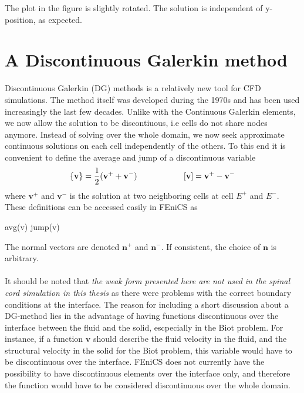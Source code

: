 The plot in the figure is slightly rotated. The solution is independent of y-position, as expected. 	

\section{A Discontinuous Galerkin method}
Discontinuous Galerkin (DG) methods is a relatively new tool for CFD simulations. The method itself was developed during the 1970s and has been used increasingly the last few decades. Unlike with the Continuous Galerkin elements, we now allow the solution to be discontiuous, i.e cells do not share nodes anymore. Instead of solving over the whole domain, we now seek approximate continuous solutions on each cell independently of the others. To this end it is convenient to define the average and jump of a discontinuous variable
\begin{align} 
\{\mathbf{v}\} = \frac{1}{2}(\mathbf{v}^+ + \mathbf{v}^-) \hspace{2 cm}  [\mathbf{v}]  =  \mathbf{v}^+ - \mathbf{v}^- \label{Avg_jump}
\end{align}
where $\mathbf{v}^+$ and $\mathbf{v}^-$ is the solution at two neighboring cells at cell $E^+$ and $E^-$. These definitions can be accessed easily in FEniCS as
\begin{center}
\begin{cverbatim}
avg(v)
jump(v)
\end{cverbatim}
\end{center}
The normal vectors are denoted $\mathbf{n}^+$ and $\mathbf{n}^-$. If consistent, the choice of $\mathbf{n}$ is arbitrary. \cite{Rivi08}
\\
\\
It should be noted that \textit{the weak form presented here are not used in the spinal cord simulation in this thesis} as there were problems with the correct boundary conditions at the interface. The reason for including a short discussion about a DG-method lies in the advantage of having functions discontinuous over the interface between the fluid and the solid, escpecially in the Biot problem. For instance, if a function $\mathbf{v}$ should describe the fluid velocity in the fluid, and the structural velocity in the solid for the Biot problem, this variable would have to be discontinuous over the interface. FEniCS does not currently have the possibility to have discontinuous elements over the interface only, and therefore the function would have to be considered discontinuous over the whole domain.
